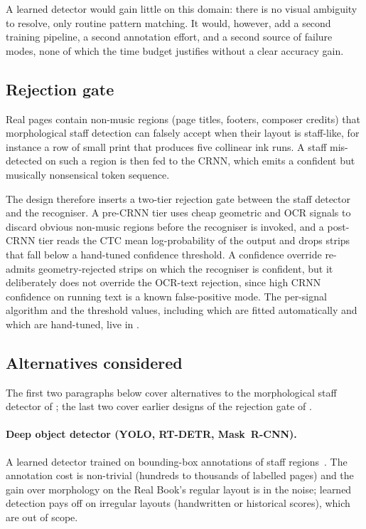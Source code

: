 A learned detector would gain little on this domain: there is no
visual ambiguity to resolve, only routine pattern matching.
It would, however, add a second training pipeline, a second
annotation effort, and a second source of failure modes, none of which
the time budget justifies without a clear accuracy gain.

\subsection{Rejection gate}
\label{sec:design-staff-reject}

Real pages contain non-music regions (page titles, footers,
composer credits) that morphological staff detection can falsely
accept when their layout is staff-like, for instance a row of small
print that produces five collinear ink runs.
A staff mis-detected on such a region is then fed to the
CRNN, which emits a confident but musically nonsensical
token sequence.

The design therefore inserts a two-tier rejection gate between the
staff detector and the recogniser. A pre-CRNN tier uses cheap
geometric and OCR signals to discard obvious non-music regions before
the recogniser is invoked, and a post-CRNN tier reads the CTC mean
log-probability of the output and drops strips that fall below a
hand-tuned confidence threshold. A confidence override re-admits
geometry-rejected strips on which the recogniser is confident, but it
deliberately does not override the OCR-text rejection, since high CRNN
confidence on running text is a known false-positive mode.
The per-signal algorithm and the threshold values, including which are
fitted automatically and which are hand-tuned, live in .

\subsection{Alternatives considered}
\label{sec:design-staffdetect-alts}

The first two paragraphs below cover alternatives to the
morphological staff detector of ;
the last two cover earlier designs of the rejection gate of
.

\paragraph{Deep object detector (YOLO, RT-DETR, Mask~R-CNN).}
A learned detector trained on bounding-box annotations of staff
regions~\cite{simonettaOpticalMusicRecognition2024}. The annotation
cost is non-trivial (hundreds to thousands of labelled pages) and the
gain over morphology on the Real Book's regular layout is in the
noise; learned detection pays off on irregular layouts (handwritten or
historical scores), which are out of scope.

